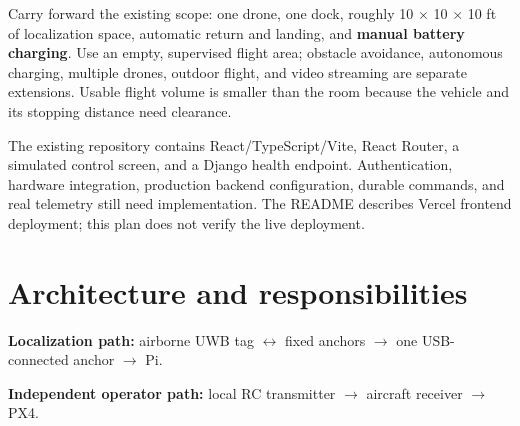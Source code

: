 \documentclass[10pt,letterpaper]{article}
\begin{document}
Carry forward the existing scope: one drone, one dock, roughly 10 $\times$ 10 $\times$ 10 ft of localization space, automatic return and landing, and \textbf{manual battery charging}. Use an empty, supervised flight area; obstacle avoidance, autonomous charging, multiple drones, outdoor flight, and video streaming are separate extensions. Usable flight volume is smaller than the room because the vehicle and its stopping distance need clearance.

The existing repository contains React/TypeScript/Vite, React Router, a simulated control screen, and a Django health endpoint. Authentication, hardware integration, production backend configuration, durable commands, and real telemetry still need implementation. The README describes Vercel frontend deployment; this plan does not verify the live deployment.

\section{Architecture and responsibilities}

\begin{center}
\end{center}
\textbf{Localization path:} airborne UWB tag $\leftrightarrow$ fixed anchors $\rightarrow$ one USB-connected anchor $\rightarrow$ Pi.\par
\textbf{Independent operator path:} local RC transmitter $\rightarrow$ aircraft receiver $\rightarrow$ PX4.\par
\end{document}
